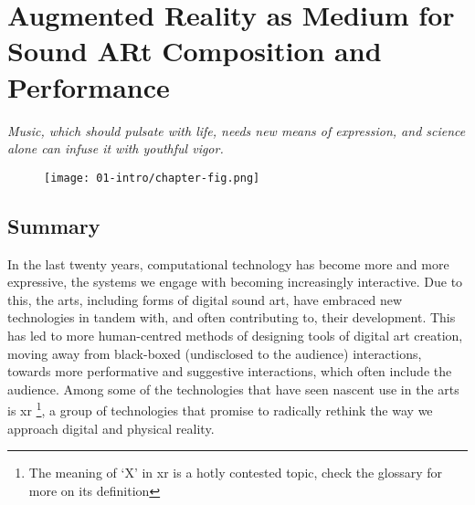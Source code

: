 \chapter{Augmented Reality as Medium for Sound ARt Composition and Performance}
\label{sec: introduction}
\epigraph{\emph{Music, which should pulsate with life, needs new means of expression, and science alone can infuse it with youthful vigor.}}{\citep{varese1966}}

\begin{figure}
    \centering
    \texttt{[image: 01-intro/chapter-fig.png]}
    \captionsetup{labelformat=empty}
    \caption[\autoref*{sec: introduction}'s page-figure: \textit{polygons\textasciitilde{}} in performance at the Attenborough Centre for Creative Arts, University of Sussex, on June 8th, (from \citeauthor{bilbow2022a}, \citeyear{bilbow2022a})]{}
\end{figure}

\clearpage
\section{Summary}\label{sec: introduction-summary}
In the last twenty years, computational technology has become more and more expressive, the systems we engage with becoming increasingly interactive. Due to this, the arts, including forms of digital sound art, have embraced new technologies in tandem with, and often contributing to, their development. This has led to more human-centred methods of designing tools of digital art creation, moving away from black-boxed (undisclosed to the audience) interactions, towards more performative and suggestive interactions, which often include the audience. Among some of the technologies that have seen nascent use in the arts is \gls{xr} \footnote{The meaning of `X' in \gls{xr} is a hotly contested topic, check the glossary for more on its definition}, a group of technologies that promise to radically rethink the way we approach digital and physical reality. 

